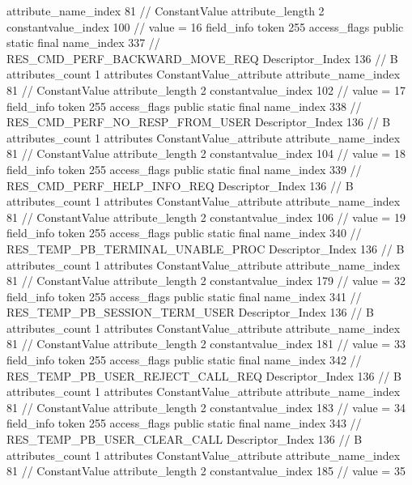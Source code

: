{{{{{{{					attribute_name_index	81		// ConstantValue
					attribute_length	2
					constantvalue_index	100		// value = 16
				}
				}
			}
			field_info {
				token	255
				access_flags	public static final
				name_index	337		// RES_CMD_PERF_BACKWARD_MOVE_REQ
				Descriptor_Index	136		// B
				attributes_count	1
				attributes {
				ConstantValue_attribute {
					attribute_name_index	81		// ConstantValue
					attribute_length	2
					constantvalue_index	102		// value = 17
				}
				}
			}
			field_info {
				token	255
				access_flags	public static final
				name_index	338		// RES_CMD_PERF_NO_RESP_FROM_USER
				Descriptor_Index	136		// B
				attributes_count	1
				attributes {
				ConstantValue_attribute {
					attribute_name_index	81		// ConstantValue
					attribute_length	2
					constantvalue_index	104		// value = 18
				}
				}
			}
			field_info {
				token	255
				access_flags	public static final
				name_index	339		// RES_CMD_PERF_HELP_INFO_REQ
				Descriptor_Index	136		// B
				attributes_count	1
				attributes {
				ConstantValue_attribute {
					attribute_name_index	81		// ConstantValue
					attribute_length	2
					constantvalue_index	106		// value = 19
				}
				}
			}
			field_info {
				token	255
				access_flags	public static final
				name_index	340		// RES_TEMP_PB_TERMINAL_UNABLE_PROC
				Descriptor_Index	136		// B
				attributes_count	1
				attributes {
				ConstantValue_attribute {
					attribute_name_index	81		// ConstantValue
					attribute_length	2
					constantvalue_index	179		// value = 32
				}
				}
			}
			field_info {
				token	255
				access_flags	public static final
				name_index	341		// RES_TEMP_PB_SESSION_TERM_USER
				Descriptor_Index	136		// B
				attributes_count	1
				attributes {
				ConstantValue_attribute {
					attribute_name_index	81		// ConstantValue
					attribute_length	2
					constantvalue_index	181		// value = 33
				}
				}
			}
			field_info {
				token	255
				access_flags	public static final
				name_index	342		// RES_TEMP_PB_USER_REJECT_CALL_REQ
				Descriptor_Index	136		// B
				attributes_count	1
				attributes {
				ConstantValue_attribute {
					attribute_name_index	81		// ConstantValue
					attribute_length	2
					constantvalue_index	183		// value = 34
				}
				}
			}
			field_info {
				token	255
				access_flags	public static final
				name_index	343		// RES_TEMP_PB_USER_CLEAR_CALL
				Descriptor_Index	136		// B
				attributes_count	1
				attributes {
				ConstantValue_attribute {
					attribute_name_index	81		// ConstantValue
					attribute_length	2
					constantvalue_index	185		// value = 35
				}
				}
}}}}}
